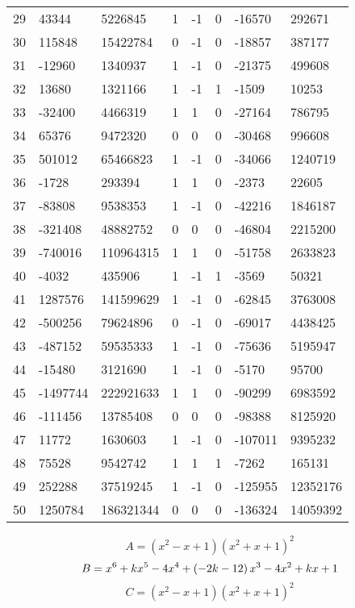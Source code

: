 \documentclass{amsart}
\begin{document}
\begin{longtable}{|l|l|l|lllll|}
29&43344&5226845&1&-1&0&-16570&292671\\
30&115848&15422784&0&-1&0&-18857&387177\\
31&-12960&1340937&1&-1&0&-21375&499608\\
32&13680&1321166&1&-1&1&-1509&10253\\
33&-32400&4466319&1&1&0&-27164&786795\\
34&65376&9472320&0&0&0&-30468&996608\\
35&501012&65466823&1&-1&0&-34066&1240719\\
36&-1728&293394&1&1&0&-2373&22605\\
37&-83808&9538353&1&-1&0&-42216&1846187\\
38&-321408&48882752&0&0&0&-46804&2215200\\
39&-740016&110964315&1&1&0&-51758&2633823\\
40&-4032&435906&1&-1&1&-3569&50321\\
41&1287576&141599629&1&-1&0&-62845&3763008\\
42&-500256&79624896&0&-1&0&-69017&4438425\\
43&-487152&59535333&1&-1&0&-75636&5195947\\
44&-15480&3121690&1&-1&0&-5170&95700\\
45&-1497744&222921633&1&1&0&-90299&6983592\\
46&-111456&13785408&0&0&0&-98388&8125920\\
47&11772&1630603&1&-1&0&-107011&9395232\\
48&75528&9542742&1&1&1&-7262&165131\\
49&252288&37519245&1&-1&0&-125955&12352176\\
50&1250784&186321344&0&0&0&-136324&14059392\\
\hline
\end{longtable}
$$A=(x^2
 - x
 + 1)(x^2
 + x
 + 1)^{2}$$
$$B=x^6
 + k\*x^5
 - 4\*x^4
 + \left(-2\*k
 - 12\right) \*x^3
 - 4\*x^2
 + k\*x
 + 1$$
$$C=(x^2
 - x
 + 1)(x^2
 + x
 + 1)^{2}$$
\end{document}
